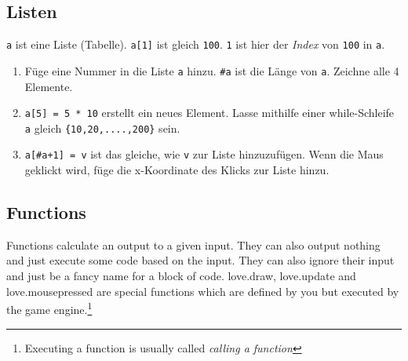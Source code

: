 \documentclass[a4paper, 11pt]{article}
\begin{document}
\subsection{Listen}

\texttt{a} ist eine Liste (Tabelle). \texttt{a[1]} ist gleich \texttt{100}. \texttt{1} ist hier der \textit{Index} von \texttt{100} in \texttt{a}.
\newline

\begin{enumerate}
  \item Füge eine Nummer in die Liste \texttt{a} hinzu. \texttt{\#a} ist die Länge von \texttt{a}. Zeichne alle 4 Elemente.
\item \texttt{a[5] = 5 * 10} erstellt ein neues Element. Lasse mithilfe einer while-Schleife \texttt{a} gleich \texttt{\{10,20,....,200\}} sein.
\item \texttt{a[\#a+1] = v} ist das gleiche, wie \texttt{v} zur Liste hinzuzufügen. Wenn die Maus geklickt wird, füge die x-Koordinate des Klicks zur Liste hinzu.
\end{enumerate}

\iffalse
\subsection{Functions}
Functions calculate an output to a given input. They can also output nothing and just execute some code based on the input. They can also ignore their input and just be a fancy name for a block of code.
love.draw, love.update and love.mousepressed are special functions which are defined by you but executed by the game engine.\footnote{Executing a function is usually called \textit{calling a function}}


\end{document}
